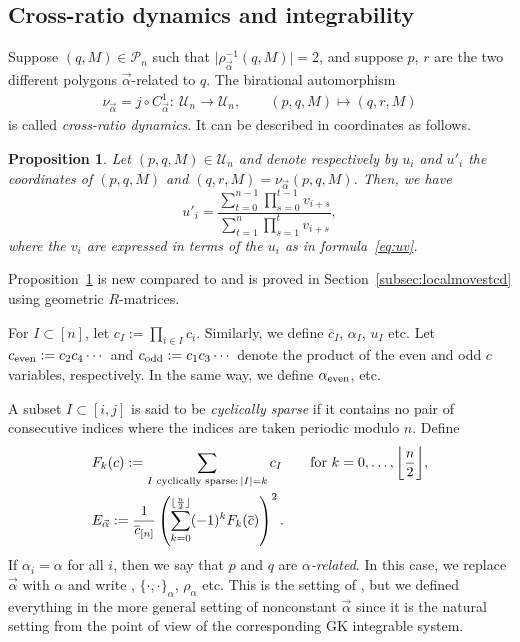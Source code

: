 \documentclass[pdftex]{sigma}
\numberwithin{equation}{section}
\newtheorem{Proposition}[Theorem]{Proposition}
 { \theoremstyle{definition}
\newtheorem{Definition}[Theorem]{Definition}
\newtheorem{Note}[Theorem]{Note}
\newtheorem{Example}[Theorem]{Example}
\newtheorem{Remark}[Theorem]{Remark} }
\DeclarePairedDelimiter\floor{\lfloor}{\rfloor}
\newcommand{\ra}{\rightarrow}
\begin{document}
	\subsection{Cross-ratio dynamics and integrability}
	
	Suppose $(q,M) \in \mathcal P_n$ such that $\bigl|\rho_{\vec \alpha}^{-1}(q,M)\bigr|=2$, and suppose $p$, $r$ are the two different polygons $\vec \alpha$-related to $q$. The birational automorphism
	\begin{align*}
		\nu_{\vec \alpha}=j\circ C^1_{\vec \alpha}\colon \ \mathcal U_n \ra \mathcal U_n,\qquad
		(p,q,M) \mapsto (q,r,M)
	\end{align*}
	is called \emph{cross-ratio dynamics}. It can be described in coordinates as follows.
	
	\begin{Proposition}
		\label{prop:uevolution}
		Let $(p,q,M)\in \mathcal U_n$ and denote respectively by $u_i$ and $u'_i$ the coordinates of $(p,q,M)$ and $(q,r,M)=\nu_{\vec \alpha}(p,q,M)$. Then, we have
		\begin{equation}
			\label{eq:ILP}
			u'_i=\frac{\sum\limits_{t=0}^{n-1}\prod\limits_{s=0}^{t-1}v_{i+s}}{\sum\limits_{t=1}^{n}\prod\limits_{s=1}^{t}v_{i+s}},
		\end{equation}
		where the $v_i$ are expressed in terms of the $u_i$ as in formula~\eqref{eq:uv}.
	\end{Proposition}
	
	Proposition~\ref{prop:uevolution} is new compared to \cite{AFIT} and is proved in Section~\ref{subsec:localmovestcd} using geometric $R$-matrices.
	
	For $I \subset [n]$, let $c_I:=\prod_{i \in I} {c_i}$. Similarly, we define $\overline{c}_I$, $\alpha_I$, $u_I$ etc. Let $c_{{\rm even}}:=c_2 c_4 \cdots $
and $c_{{\rm odd}}:=c_1 c_3 \cdots $ denote the product of the even and odd $c$ variables, respectively. In the same way, we define $\alpha_{{\rm even}}$, etc.
	
	A subset $I \subset [i,j]$ is said to be \emph{cyclically sparse} if it contains no pair of consecutive indices where the indices are taken periodic modulo $n$. Define
	\begin{align*}
		&F_k(c):= \sum_{I \text{ cyclically sparse}: \, |I|=k} c_I \qquad\text{for $k=0,\dots, \biggl\lfloor{\frac n 2}\biggr\rfloor$},\\
		&E_{\vec \alpha}:= \frac{1}{\overline c_{[n]}} \left( \sum_{k=0}^{\floor{\frac n 2}} (-1)^k F_k (\overline{c}
		) \right)^2.
	\end{align*}
If $\alpha_i = \alpha$ for all $i$, then we say that $p$ and $q$ are \emph{$\alpha$-related}. In this case, we replace $\vec{\alpha}$ with $\alpha$ and write , $\{\cdot,\cdot\}_\alpha$, $\rho_\alpha$ etc. This is the setting of \cite{AFIT}, but we defined everything in the more general setting of nonconstant $\vec \alpha$ since it is the natural setting from the point of view of the corresponding GK integrable system.
	
\end{document}
